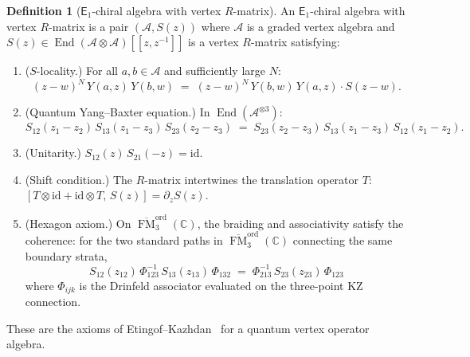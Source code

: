 \documentclass[11pt,reqno]{amsart}
\theoremstyle{definition}
\newtheorem{definition}[theorem]{Definition}
\theoremstyle{remark}
\newcommand{\cA}{\mathcal{A}}
\newcommand{\Eone}{\mathsf{E}_{1}}
\DeclareMathOperator{\End}{End}
\DeclareMathOperator{\FM}{FM}
\newcommand{\CC}{\mathbb{C}}
\newcommand{\id}{\mathrm{id}}
\numberwithin{equation}{section}
\begin{document}
\begin{definition}[$\Eone$-chiral algebra with vertex
$R$-matrix]
\label{def:e1-chiral-rmatrix}
An $\Eone$-chiral algebra with vertex $R$-matrix is a pair
$(\cA, S(z))$ where $\cA$ is a graded vertex algebra and
$S(z) \in \End(\cA \otimes \cA)[[z, z^{-1}]]$ is a vertex
$R$-matrix satisfying:
\begin{enumerate}[label=\textup{(\roman*)}]
\item \textup{($S$-locality.)} For all $a, b \in \cA$
  and sufficiently large $N$:
  \begin{equation}\label{eq:s-locality-sec8}
    (z - w)^N\, Y(a,z)\, Y(b,w)
    \;=\;
    (z - w)^N\, Y(b,w)\, Y(a,z) \cdot S(z - w).
  \end{equation}
\item \textup{(Quantum Yang--Baxter equation.)} In
  $\End(\cA^{\otimes 3})$:
  \begin{equation}\label{eq:qybe}
    S_{12}(z_1 - z_2)\, S_{13}(z_1 - z_3)\, S_{23}(z_2 - z_3)
    \;=\;
    S_{23}(z_2 - z_3)\, S_{13}(z_1 - z_3)\, S_{12}(z_1 - z_2).
  \end{equation}
\item \textup{(Unitarity.)}
  $S_{12}(z)\, S_{21}(-z) = \id$.
\item \textup{(Shift condition.)} The $R$-matrix
  intertwines the translation operator $T$:
  $[T \otimes \id + \id \otimes T,\, S(z)]
  = \partial_z S(z)$.
\item \textup{(Hexagon axiom.)} On
  $\overline{\FM}_3^{\mathrm{ord}}(\CC)$, the
  braiding and associativity satisfy the coherence:
  for the two standard paths in
  $\overline{\FM}_3^{\mathrm{ord}}(\CC)$ connecting the
  same boundary strata,
  \begin{equation}\label{eq:hexagon}
    S_{12}(z_{12})\, \Phi_{123}^{-1}\, S_{13}(z_{13})\, \Phi_{132}
    \;=\; \Phi_{213}^{-1}\, S_{23}(z_{23})\, \Phi_{123}
  \end{equation}
  where $\Phi_{ijk}$ is the Drinfeld associator
  evaluated on the three-point KZ connection.
\end{enumerate}
These are the axioms of Etingof--Kazhdan~\cite{EK00} for a
quantum vertex operator algebra.
\end{definition}
\end{document}
